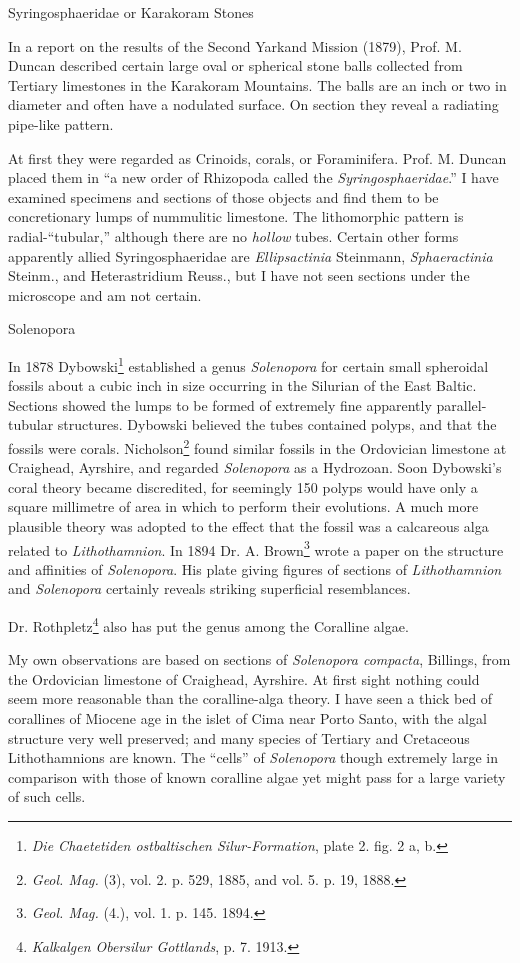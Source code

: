 \documentclass[a4paper, 12pt, oneside]{article}
\begin{document}
Syringosphaeridae or Karakoram Stones

In a report on the results of the Second Yarkand Mission (1879), Prof. M. Duncan described certain large oval or spherical stone balls collected from Tertiary limestones in the Karakoram Mountains. The balls are an inch or two in diameter and often have a nodulated surface. On section they reveal a radiating pipe-like pattern.

At first they were regarded as Crinoids, corals, or Foraminifera. Prof. M. Duncan placed them in ``a new order of Rhizopoda called the \emph{Syringosphaeridae}.'' I have examined specimens and sections of those objects and find them to be concretionary lumps of nummulitic limestone. The lithomorphic pattern is radial-``tubular,'' although there are no \emph{hollow} tubes. Certain other forms apparently allied Syringosphaeridae are \emph{Ellipsactinia} Steinmann, \emph{Sphaeractinia} Steinm., and Heterastridium Reuss., but I have not seen sections under the microscope and am not certain.

Solenopora

In 1878 Dybowski\footnote{\emph{Die Chaetetiden ostbaltischen Silur-Formation}, plate 2. fig. 2 a, b.} established a genus \emph{Solenopora} for certain small spheroidal fossils about a cubic inch in size occurring in the Silurian of the East Baltic. Sections showed the lumps to be formed of extremely fine apparently parallel-tubular structures. Dybowski believed the tubes contained polyps, and that the fossils were corals. Nicholson\footnote{\emph{Geol. Mag.} (3), vol. 2. p. 529, 1885, and vol. 5. p. 19, 1888.} found similar fossils in the Ordovician limestone at Craighead, Ayrshire, and regarded \emph{Solenopora} as a Hydrozoan. Soon Dybowski's coral theory became discredited, for seemingly 150 polyps would have only a square millimetre of area in which to perform their evolutions. A much more plausible theory was adopted to the effect that the fossil was a calcareous alga related to \emph{Lithothamnion}. In 1894 Dr. A. Brown\footnote{\emph{Geol. Mag.} (4.), vol. 1. p. 145. 1894.} wrote a paper on the structure and affinities of \emph{Solenopora}. His plate giving figures of sections of \emph{Lithothamnion} and \emph{Solenopora} certainly reveals striking superficial resemblances.

Dr. Rothpletz\footnote{\emph{Kalkalgen Obersilur Gottlands}, p. 7. 1913.} also has put the genus among the Coralline algae.

My own observations are based on sections of \emph{Solenopora compacta}, Billings, from the Ordovician limestone of Craighead, Ayrshire. At first sight nothing could seem more reasonable than the coralline-alga theory. I have seen a thick bed of corallines of Miocene age in the islet of Cima near Porto Santo, with the algal structure very well preserved; and many species of Tertiary and Cretaceous Lithothamnions are known. The ``cells'' of \emph{Solenopora} though extremely large in comparison with those of known coralline algae yet might pass for a large variety of such cells.
\end{document}
